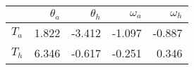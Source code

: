 \begin{tabular}{lrrrr}
  \toprule
        & $\theta_a$ & $\theta_h$ & $\omega_a$ & $\omega_h$ \\
  \midrule
  $T_a$ & 1.822 & -3.412 & -1.097 & -0.887 \\
  $T_h$ & 6.346 & -0.617 & -0.251 & 0.346  \\
  \bottomrule
\end{tabular}